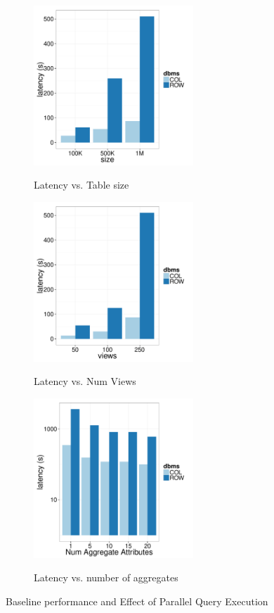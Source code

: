 \begin{figure}[t]
	\centering
	\begin{subfigure}{0.33\linewidth}
		{\includegraphics[width=6cm] {Images/baselines_by_size.pdf}}
		\caption{Latency vs. Table size}
		\label{fig:baseline_size}
	\end{subfigure}
	\begin{subfigure}{0.33\linewidth}
		\centering
		{\includegraphics[width=6cm] {Images/baselines_by_views.pdf}}
		\caption{Latency vs. Num Views}
		\label{fig:baseline_views}
	\end{subfigure}
	\begin{subfigure}{0.33\linewidth}
		{\includegraphics[width=6cm] {Images/multi_agg.pdf}}
		\caption{Latency vs. number of aggregates }
		\label{fig:multi_agg}
	\end{subfigure}
	\caption{Baseline performance and Effect of Parallel Query Execution }
	\label{fig:bank_perf}
\end{figure}

